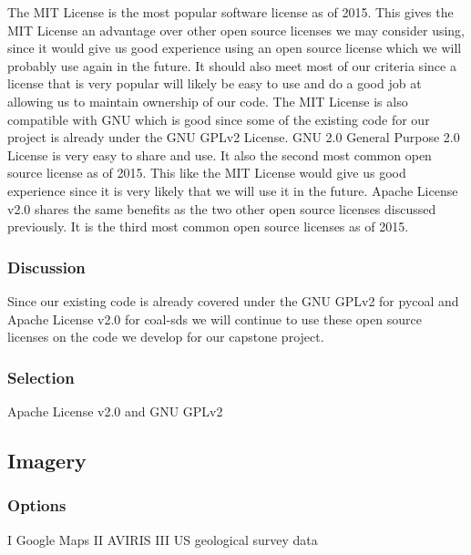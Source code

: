 \documentclass[10pt,draftclsnofoot,onecolumn,journal,compsoc]{IEEEtran}
\begin{document}
\noindent The MIT License is the most popular software license as of 2015\cite{19}. This gives the MIT License an advantage over other open source licenses we may consider using, since it would give us good experience using an open source license which we will probably use again in the future. It should also meet most of our criteria since a license that is very popular will likely be easy to use and do a good job at allowing us to maintain ownership of our code. The MIT License is also compatible with GNU which is good since some of the existing code for our project is already under the GNU GPLv2 License.
\newline
\noindent GNU 2.0 General Purpose 2.0 License is very easy to share and use. It also the second most common open source license as of 2015\cite{19}. This like the MIT License would give us good experience since it is very likely that we will use it in the future.
\newline
\noindent Apache License v2.0 shares the same benefits as the two other open source licenses discussed previously. It is the third most common open source licenses as of 2015\cite{19}.

\subsubsection{Discussion}

\noindent Since our existing code is already covered under the GNU GPLv2 for pycoal and Apache License v2.0 for coal-sds we will continue to use these open source licenses on the code we develop for our capstone project.

\subsubsection{Selection}

\noindent  Apache License v2.0 and GNU GPLv2

\subsection{Imagery}

\subsubsection{Options}

\noindent I Google Maps \newline
\noindent II AVIRIS \newline
\noindent III US geological survey data
\end{document}
